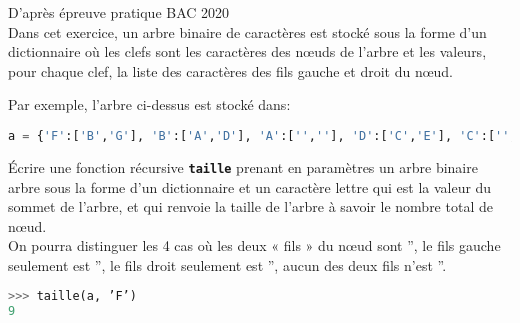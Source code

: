 \documentclass[a4paper,11pt]{article}
\begin{document}
\begin{exo}
D'après épreuve pratique BAC 2020\\
Dans cet exercice, un arbre binaire de caractères est stocké sous la forme d’un dictionnaire où les clefs sont les caractères des nœuds de l’arbre et les valeurs, pour
chaque clef, la liste des caractères des fils gauche et droit du nœud.
\begin{center}
\end{center}
Par exemple, l'arbre ci-dessus est stocké dans:
\begin{center}
\begin{lstlisting}[language=Python  , xleftmargin=2em, xrightmargin=2em]
a = {'F':['B','G'], 'B':['A','D'], 'A':['',''], 'D':['C','E'], 'C':['',''], 'E':['',''], 'G':['','I'], 'I':['','H'], 'H':['','']}
\end{lstlisting}
\end{center}
Écrire une fonction récursive \texttt{\textbf{taille}} prenant en paramètres un arbre binaire arbre
sous la forme d’un dictionnaire et un caractère lettre qui est la valeur du sommet de l’arbre, et qui renvoie la taille de l’arbre à savoir le nombre total de nœud.\\
On pourra distinguer les 4 cas où les deux « fils » du nœud sont '', le fils gauche seulement est '', le fils droit seulement est '', aucun des deux fils n’est ''.
\begin{center}
\begin{lstlisting}[language=Python  , xleftmargin=2em, xrightmargin=2em]
>>> taille(a, ’F’)
9
\end{lstlisting}
\label{CODE}
\end{center}
\end{exo}
\end{document}
